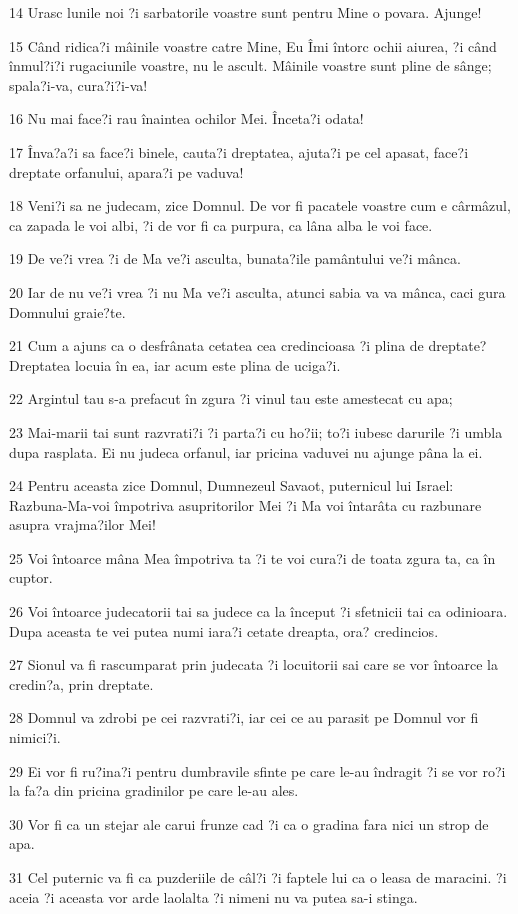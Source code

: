 \par 14 Urasc lunile noi ?i sarbatorile voastre sunt pentru Mine o povara. Ajunge!
\par 15 Când ridica?i mâinile voastre catre Mine, Eu Îmi întorc ochii aiurea, ?i când înmul?i?i rugaciunile voastre, nu le ascult. Mâinile voastre sunt pline de sânge; spala?i-va, cura?i?i-va!
\par 16 Nu mai face?i rau înaintea ochilor Mei. Înceta?i odata!
\par 17 Înva?a?i sa face?i binele, cauta?i dreptatea, ajuta?i pe cel apasat, face?i dreptate orfanului, apara?i pe vaduva!
\par 18 Veni?i sa ne judecam, zice Domnul. De vor fi pacatele voastre cum e cârmâzul, ca zapada le voi albi, ?i de vor fi ca purpura, ca lâna alba le voi face.
\par 19 De ve?i vrea ?i de Ma ve?i asculta, bunata?ile pamântului ve?i mânca.
\par 20 Iar de nu ve?i vrea ?i nu Ma ve?i asculta, atunci sabia va va mânca, caci gura Domnului graie?te.
\par 21 Cum a ajuns ca o desfrânata cetatea cea credincioasa ?i plina de dreptate? Dreptatea locuia în ea, iar acum este plina de uciga?i.
\par 22 Argintul tau s-a prefacut în zgura ?i vinul tau este amestecat cu apa;
\par 23 Mai-marii tai sunt razvrati?i ?i parta?i cu ho?ii; to?i iubesc darurile ?i umbla dupa rasplata. Ei nu judeca orfanul, iar pricina vaduvei nu ajunge pâna la ei.
\par 24 Pentru aceasta zice Domnul, Dumnezeul Savaot, puternicul lui Israel: Razbuna-Ma-voi împotriva asupritorilor Mei ?i Ma voi întarâta cu razbunare asupra vrajma?ilor Mei!
\par 25 Voi întoarce mâna Mea împotriva ta ?i te voi cura?i de toata zgura ta, ca în cuptor.
\par 26 Voi întoarce judecatorii tai sa judece ca la început ?i sfetnicii tai ca odinioara. Dupa aceasta te vei putea numi iara?i cetate dreapta, ora? credincios.
\par 27 Sionul va fi rascumparat prin judecata ?i locuitorii sai care se vor întoarce la credin?a, prin dreptate.
\par 28 Domnul va zdrobi pe cei razvrati?i, iar cei ce au parasit pe Domnul vor fi nimici?i.
\par 29 Ei vor fi ru?ina?i pentru dumbravile sfinte pe care le-au îndragit ?i se vor ro?i la fa?a din pricina gradinilor pe care le-au ales.
\par 30 Vor fi ca un stejar ale carui frunze cad ?i ca o gradina fara nici un strop de apa.
\par 31 Cel puternic va fi ca puzderiile de câl?i ?i faptele lui ca o leasa de maracini. ?i aceia ?i aceasta vor arde laolalta ?i nimeni nu va putea sa-i stinga.

